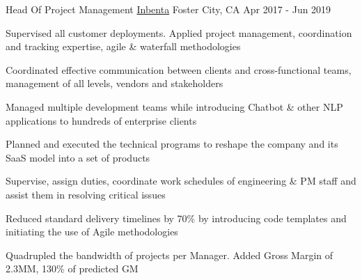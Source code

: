 
\begin{cventries}

  \cventry
    {Head Of Project Management} %
    {\href{https://www.inbenta.com}{Inbenta}} %
    {Foster City, CA} %
    {Apr 2017 - Jun 2019} %
    {
      \begin{cvitems} %
        \item {Supervised all customer deployments. Applied project management, coordination and tracking expertise, agile \& waterfall methodologies}
        \item {Coordinated effective communication between clients and cross-functional teams, management of all levels, vendors and stakeholders}
        \item {Managed multiple development teams while introducing Chatbot \& other NLP applications to hundreds of enterprise clients}
        \item {Planned and executed the technical programs to reshape the company and its SaaS model into a set of products}
        \item {Supervise, assign duties, coordinate work schedules of engineering \& PM staff and assist them in resolving critical issues}
        \item {Reduced standard delivery timelines by 70\% by introducing code templates and initiating the use of Agile methodologies}
        \item {Quadrupled the bandwidth of projects per Manager. Added Gross Margin of 2.3MM, 130\% of predicted GM}
      \end{cvitems}
    }


\end{cventries}
